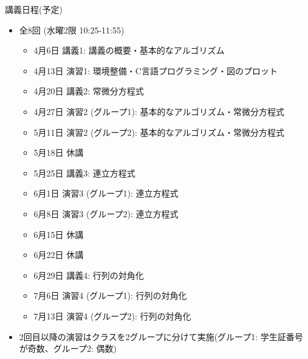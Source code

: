 \begin{frame}[t]{講義日程(予定)}
  \begin{itemize}
  \item 全8回 (水曜2限 10:25-11:55)
    \begin{itemize}
    \item 4月6日 講義1: 講義の概要・基本的なアルゴリズム
    \item 4月13日 演習1: 環境整備・C言語プログラミング・図のプロット
    \item 4月20日 講義2: 常微分方程式
    \item 4月27日 演習2 (グループ1): 基本的なアルゴリズム・常微分方程式
    \item 5月11日 演習2 (グループ2): 基本的なアルゴリズム・常微分方程式
    \item {\color{gray} 5月18日 休講}
    \item 5月25日 講義3: 連立方程式
    \item 6月1日 演習3 (グループ1): 連立方程式
    \item 6月8日 演習3 (グループ2): 連立方程式
    \item {\color{gray} 6月15日 休講}
    \item {\color{gray} 6月22日 休講}
    \item 6月29日 講義4: 行列の対角化
    \item 7月6日 演習4 (グループ1): 行列の対角化
    \item 7月13日 演習4 (グループ2): 行列の対角化
    \end{itemize}
  \item 2回目以降の演習はクラスを2グループに分けて実施(グループ1: 学生証番号が奇数、グループ2: 偶数)
  \end{itemize}
\end{frame}

